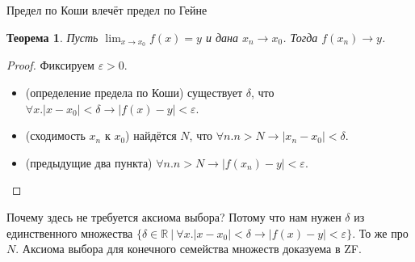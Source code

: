 \documentclass[aspectratio=169]{beamer}
\newtheorem{thm}{Теорема}[section]
\begin{document}
\begin{frame}{Предел по Коши влечёт предел по Гейне}
\begin{thm}Пусть $\lim_{x \rightarrow x_0} f(x) = y$ и дана $x_n \rightarrow x_0$.
Тогда $f(x_n) \rightarrow y$.\end{thm}
\begin{proof}
Фиксируем $\varepsilon > 0$.
\begin{itemize}
\item (определение предела по Коши) существует $\delta$, что $\forall x.|x - x_0| < \delta \rightarrow |f(x) - y| < \varepsilon$.
\item (сходимость $x_n$ к $x_0$) найдётся $N$, что $\forall n.n > N \rightarrow |x_n - x_0|<\delta$.
\item (предыдущие два пункта) $\forall n.n > N \rightarrow |f(x_n) - y| < \varepsilon$.
\end{itemize}
\end{proof}\pause

Почему здесь не требуется аксиома выбора? Потому что нам нужен $\delta$ из единственного множества 
$\{ \delta \in \mathbb{R}\ |\ \forall x.|x - x_0| < \delta \rightarrow |f(x) - y| < \varepsilon\}$. 
То же про $N$. Аксиома выбора для конечного семейства множеств доказуема в ZF.
\end{frame}
\end{document}
